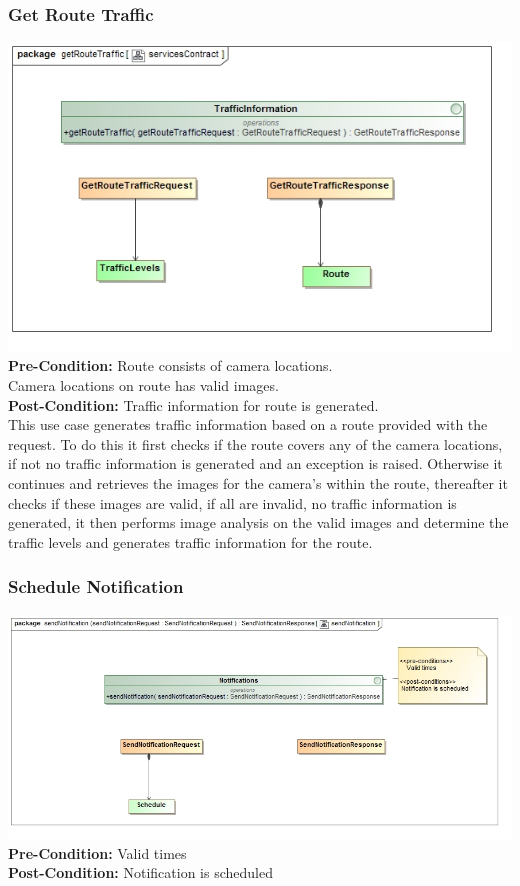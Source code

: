 \documentclass[a4paper,12pt]{article}
\begin{document}
\subsubsection{Get Route Traffic}
\includegraphics[width=\textwidth]{images/scDetermine_Traffic.jpg}
\textbf{Pre-Condition: }
Route consists of camera locations.\\
Camera locations on route has valid images.\\
\textbf{Post-Condition: }
Traffic information for route is generated.\\

This use case generates traffic information based on a route provided with the request. To do this it first checks if the route covers any of the camera locations, if not no traffic information is generated and an exception is raised. Otherwise it continues and retrieves the images for the camera's within the route, thereafter it checks if these images are valid, if all are invalid, no traffic information is generated, it then performs image analysis on the valid images and determine the traffic levels and generates traffic information for the route.

\subsubsection{Schedule Notification}
\includegraphics[width=\textwidth]{images/scSchedule_Notification.jpg}
\textbf{Pre-Condition: }
Valid times\\
\textbf{Post-Condition: }
Notification is scheduled\\
\end{document}
